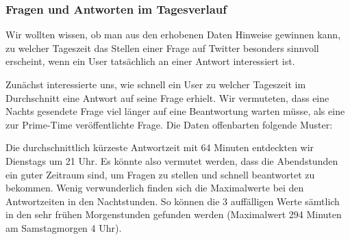 \documentclass[main.tex]{subfiles}
\begin{document}
\subsubsection{Fragen und Antworten im Tagesverlauf}
Wir wollten wissen, ob man aus den erhobenen Daten Hinweise gewinnen kann, zu welcher Tageszeit das Stellen einer Frage auf Twitter besonders sinnvoll erscheint, wenn ein User tatsächlich an einer Antwort interessiert ist. 

Zunächst interessierte uns, wie schnell ein User zu welcher Tageszeit im Durchschnitt eine Antwort auf seine Frage erhielt. Wir vermuteten, dass eine Nachts gesendete Frage viel länger auf eine Beantwortung warten müsse, als eine zur Prime-Time veröffentlichte Frage. Die Daten offenbarten folgende Muster:

\datatable
\makeatletter
{}
\makeatother


\begin{center}
\end{center}

Die durchschnittlich kürzeste Antwortzeit mit 64 Minuten entdeckten wir Dienstags um 21 Uhr. Es könnte also vermutet werden, dass die Abendstunden ein guter Zeitraum sind, um Fragen zu stellen und schnell beantwortet zu bekommen. Wenig verwunderlich finden sich die Maximalwerte bei den Antwortzeiten in den Nachtstunden. So können die 3 auffälligen Werte sämtlich in den sehr frühen Morgenstunden gefunden werden (Maximalwert 294 Minuten am Samstagmorgen 4 Uhr).
\end{document}
